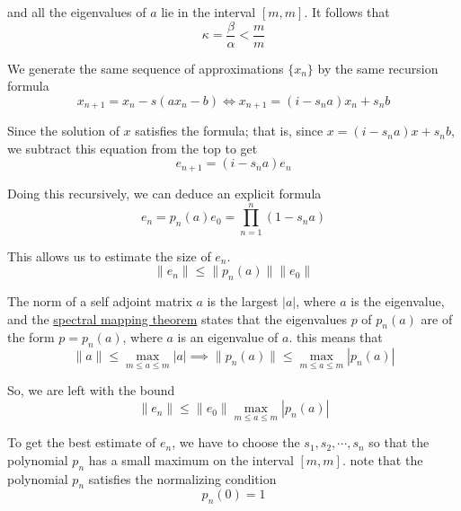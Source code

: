   and all the eigenvalues of $a$ lie in the interval $[m, m]$. It follows that
  \begin{equation}
    \kappa = \frac{\beta}{\alpha} < \frac{m}{m}
  \end{equation}

  We generate the same sequence of approximations $\{x_n\}$ by the same recursion formula
  \begin{equation}
    x_{n+1} = x_n - s(a x_n - b) \iff x_{n+1} = (i - s_n a) x_n + s_n b
  \end{equation}

  Since the solution of $x$ satisfies the formula; that is, since $x = (i - s_n a) x + s_n b$, we subtract this equation from the top to get
  \begin{equation}
    e_{n+1} = (i - s_n a) e_n
  \end{equation}

  Doing this recursively, we can deduce an explicit formula 
  \begin{equation}
    e_n = p_n (a) e_0 = \prod_{n=1}^n (1 - s_n a)
  \end{equation}

  This allows us to estimate the size of $e_n$. 
  \begin{equation}
    \|e_n\| \leq \|p_n (a)\| \|e_0\|
  \end{equation}

  The norm of a self adjoint matrix $a$ is the largest $|a|$, where $a$ is the eigenvalue, and the \hyperref[thm:spectral-mapping-theorem]{spectral mapping theorem} states that the eigenvalues $p$ of $p_n (a)$ are of the form $p = p_n (a)$, where $a$ is an eigenvalue of $a$. this means that
  \begin{equation}
    \|a\| \leq \max_{m \leq a \leq m} |a| \implies \|p_n (a)\| \leq \max_{m \leq a \leq m} |p_n (a)|
  \end{equation}

  So, we are left with the bound
  \begin{equation}
    \|e_n\| \leq \|e_0\| \max_{m \leq a \leq m} |p_n (a)|
  \end{equation}

  To get the best estimate of $e_n$, we have to choose the $s_1, s_2, \cdots, s_n$ so that the polynomial $p_n$ has a small maximum on the interval $[m, m]$. note that the polynomial $p_n$ satisfies the normalizing condition 
  \begin{equation}
    p_n(0) = 1
  \end{equation}

